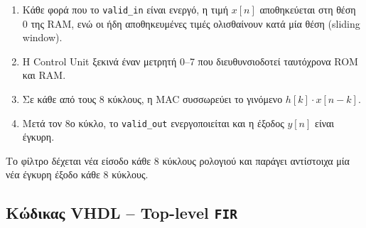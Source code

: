 \documentclass[12pt]{article}
\begin{document}
\begin{enumerate}
    \item Κάθε φορά που το \texttt{valid\_in} είναι ενεργό, η τιμή $x[n]$ αποθηκεύεται στη θέση 0 της RAM, ενώ οι ήδη αποθηκευμένες τιμές ολισθαίνουν κατά μία θέση (sliding window).
    \item Η Control Unit ξεκινά έναν μετρητή 0--7 που διευθυνσιοδοτεί ταυτόχρονα ROM και RAM.
    \item Σε κάθε από τους 8 κύκλους, η MAC συσσωρεύει το γινόμενο $h[k] \cdot x[n-k]$.
    \item Μετά τον 8ο κύκλο, το \texttt{valid\_out} ενεργοποιείται και η έξοδος $y[n]$ είναι έγκυρη.
\end{enumerate}

Το φίλτρο δέχεται νέα είσοδο κάθε 8 κύκλους ρολογιού και παράγει αντίστοιχα μία νέα έγκυρη έξοδο κάθε 8 κύκλους.

\subsection*{Κώδικας VHDL -- Top-level \texttt{FIR}}
\end{document}
